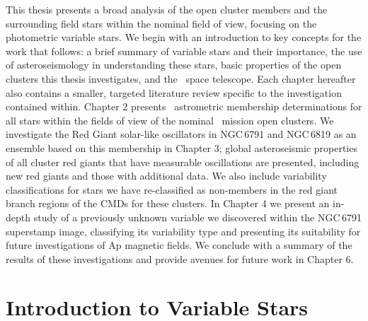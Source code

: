 This thesis presents a broad analysis of the open cluster members and the surrounding field stars within the nominal \Kepler{} field of view, focusing on the photometric variable stars. We begin with an introduction to key concepts for the work that follows: a brief summary of variable stars and their importance, the use of asteroseismology in understanding these stars, basic properties of the open clusters this thesis investigates, and the \Kepler~space telescope. Each chapter hereafter also contains a smaller, targeted literature review specific to the investigation contained within. Chapter 2 presents \Gaia~astrometric membership determinations for all stars within the fields of view of the nominal \Kepler~mission open clusters. We investigate the Red Giant solar-like oscillators in NGC\,6791 and NGC\,6819 as an ensemble based on this membership in Chapter 3; global asteroseismic properties of all cluster red giants that have measurable oscillations are presented, including new red giants and those with additional data. We also include variability classifications for stars we have re-classified as non-members in the red giant branch regions of the CMDs for these clusters. In Chapter 4 we present an in-depth study of a previously unknown variable we discovered within the NGC\,6791 superstamp image, classifying its variability type and presenting its suitability for future investigations of Ap magnetic fields. We conclude with a summary of the results of these investigations and provide avenues for future work in Chapter 6.


\section{Introduction to Variable Stars}

